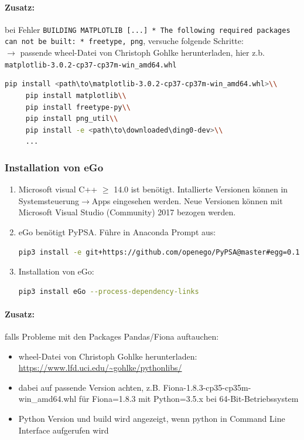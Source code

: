 \documentclass[
a4paper,     %
12pt         %
]{scrartcl}  %
\begin{document}
\paragraph{Zusatz: } bei Fehler \texttt{BUILDING MATPLOTLIB [...] * The following required packages can not be built: * freetype, png}, versuche folgende Schritte:\\
$\rightarrow$ passende wheel-Datei von Christoph Gohlke herunterladen, hier z.b. \texttt{matplotlib-3.0.2-cp37-cp37m-win\_amd64.whl}\\
\begin{lstlisting}[language=bash]
	 pip install <path\to\matplotlib-3.0.2-cp37-cp37m-win_amd64.whl>\\
	 pip install matplotlib\\
	 pip install freetype-py\\
	 pip install png_util\\
	 pip install -e <path\to\downloaded\ding0-dev>\\
	 ...
\end{lstlisting}

\subsubsection{Installation von eGo}
\begin{enumerate}
	\item Microsoft visual C++ $\geq$ 14.0 ist benötigt. Intallierte Versionen können in Systemsteuerung$\rightarrow$Apps eingesehen werden. Neue Versionen können mit Microsoft Visual Studio (Community) 2017 bezogen werden.
	\item eGo benötigt PyPSA. Führe in Anaconda Prompt aus:
	\begin{lstlisting}[language=bash]
		pip3 install -e git+https://github.com/openego/PyPSA@master#egg=0.11.0fork
	\end{lstlisting}
	\item Installation von eGo:
	\begin{lstlisting}[language=bash]
		pip3 install eGo --process-dependency-links
	\end{lstlisting}
\end{enumerate}

\paragraph{Zusatz: }falls Probleme mit den Packages Pandas/Fiona auftauchen:
\begin{itemize}
\item wheel-Datei von Christoph Gohlke herunterladen: \url{https://www.lfd.uci.edu/~gohlke/pythonlibs/}
\item dabei auf passende Version achten, z.B. Fiona-1.8.3-cp35-cp35m-win\_amd64.whl für Fiona=1.8.3 mit Python=3.5.x bei 64-Bit-Betriebssystem
\item Python Version und build wird angezeigt, wenn python in Command Line Interface aufgerufen wird

\end{itemize}
\end{document}
